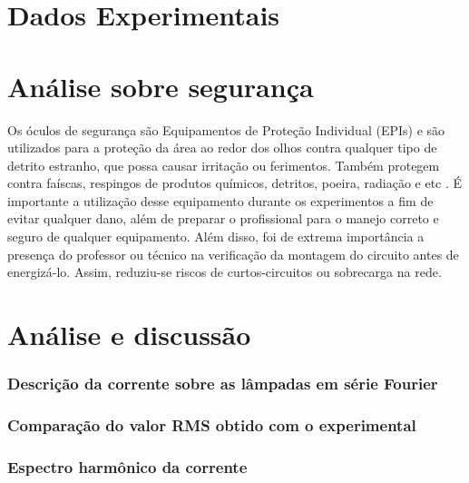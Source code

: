 \documentclass[a4paper,12pt,oneside,openany,table,xcdraw]{article}
\begin{document}
\newpage
\section{Dados Experimentais} \label{dados}

\section{Análise sobre segurança} %
Os óculos de segurança são Equipamentos de Proteção Individual (EPIs) e são utilizados para a proteção da área ao redor dos olhos contra qualquer tipo de detrito estranho, que possa causar irritação ou ferimentos. Também protegem contra faíscas, respingos de produtos químicos, detritos, poeira, radiação e etc \cite{safe}.
É importante a utilização desse equipamento durante os experimentos a fim de evitar qualquer dano, além de preparar o profissional para o manejo correto e seguro de qualquer equipamento.
Além disso, foi de extrema importância a presença do professor ou técnico na verificação da montagem do circuito antes de energizá-lo. Assim, reduziu-se riscos de curtos-circuitos ou sobrecarga na rede.

\vspace{0.2cm}
\section{Análise e discussão} %
\subsubsection{Descrição da corrente sobre as lâmpadas em série Fourier}

\subsubsection{Comparação do valor RMS obtido com o experimental}

\subsubsection{Espectro harmônico da corrente}
\end{document}
